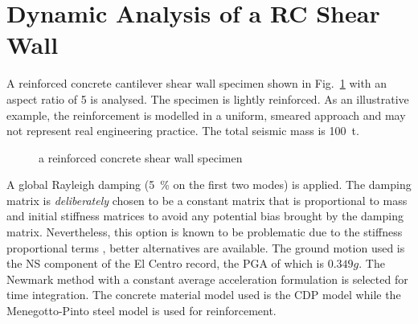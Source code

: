 \documentclass[3p,sort&compress,review,11pt,fleqn]{elsarticle}
\newcommand*{\figref}[1]{Fig.~\ref{#1}}
\begin{document}
\section{Dynamic Analysis of a RC Shear Wall}\label{sec:rc_wall_dynamic}
A reinforced concrete cantilever shear wall specimen shown in \figref{fig:rc_wall} with an aspect ratio of \num{5} is analysed. The specimen is lightly reinforced. As an illustrative example, the reinforcement is modelled in a uniform, smeared approach and may not represent real engineering practice. The total seismic mass is \SI{100}{\tonne}.
\begin{figure}[htb]
\centering\footnotesize
{}
\caption{a reinforced concrete shear wall specimen}\label{fig:rc_wall}
\end{figure}

A global Rayleigh damping (\SI{5}{\percent} on the first two modes) is applied. The damping matrix is \textit{deliberately} chosen to be a constant matrix that is proportional to mass and initial stiffness matrices to avoid any potential bias brought by the damping matrix. Nevertheless, this option is known to be problematic due to the stiffness proportional terms \citep{Carr1997,Chopra2015}, better alternatives are available. The ground motion used is the NS component of the El Centro record, the PGA of which is $0.349g$. The Newmark method with a constant average acceleration formulation is selected for time integration. The concrete material model used is the CDP model while the Menegotto-Pinto steel model \citep{Menegotto1973} is used for reinforcement.
\end{document}
